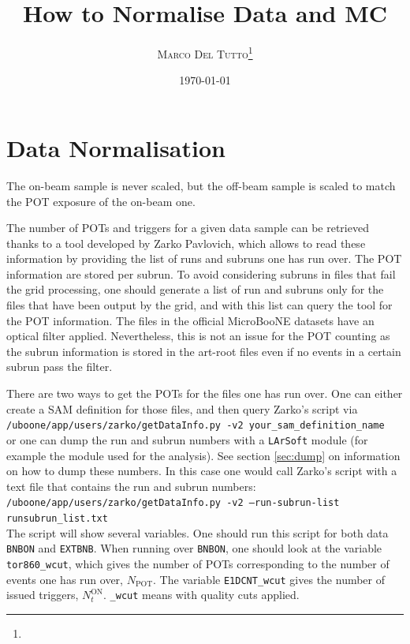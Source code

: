 \documentclass[a4paper, oneside, 12pt, onecolumn]{article}
\title{How to Normalise Data and MC} %
\author{%
\textsc{Marco Del Tutto}\thanks{\mail{marco.deltutto@physics.ox.ac.uk}} \\ %
}
\date{\today} %
\newcommand{\ls}{\texttt{LArSoft}\xspace}
\newcommand{\extbnb}{\texttt{EXTBNB}\xspace}
\newcommand{\bnbon}{\texttt{BNBON}\xspace}
\begin{document}
\maketitle





\section{Data Normalisation}

The on-beam sample is never scaled, but the off-beam sample is scaled to match the POT exposure of the on-beam one.

The number of POTs and triggers for a given data sample can be retrieved thanks to a tool developed by Zarko Pavlovich, which allows to read these information by providing the list of runs and subruns one has run over. The POT information are stored per subrun. To avoid considering subruns in files that fail the grid processing, one should generate a list of run and subruns only for the files that have been output by the grid, and with this list can query the tool for the POT information. The files in the official MicroBooNE datasets have an optical filter applied. Nevertheless, this is not an issue for the POT counting as the subrun information is stored in the art-root files even if no events in a certain subrun pass the filter.

There are two ways to get the POTs for the files one has run over. One can either create a SAM definition for those files, and then query Zarko's script via\\

\texttt{/uboone/app/users/zarko/getDataInfo.py -v2 your\_sam\_definition\_name}\\

or one can dump the run and subrun numbers with a \ls module (for example the module used for the analysis). See section \ref{sec:dump} on information on how to dump these numbers. In this case one would call Zarko's script with a text file that contains the run and subrun numbers:\\

\texttt{/uboone/app/users/zarko/getDataInfo.py -v2 --run-subrun-list runsubrun\_list.txt}\\

The script will show several variables. One should run this script for both data \bnbon and \extbnb. When running over \bnbon, one should look at the variable \texttt{tor860\_wcut}, which gives the number of POTs corresponding to the number of events one has run over, $N_\text{POT}$. The variable \texttt{E1DCNT\_wcut} gives the number of issued triggers, $N_t^\text{ON}$. \texttt{\_wcut} means with quality cuts applied.
\end{document}
